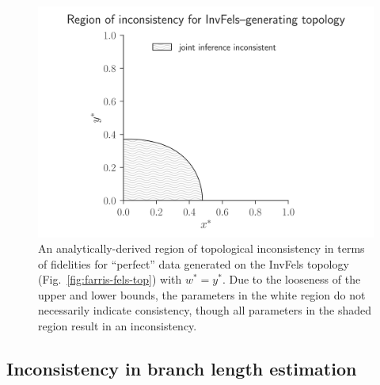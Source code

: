 \documentclass[11pt]{article}
\begin{document}
\begin{figure}
\centering
\includegraphics[width=\textwidth]{topology-inconsistency-inkscape}
\caption{
    An analytically-derived region of topological inconsistency in terms of fidelities for ``perfect'' data generated on the InvFels topology (Fig.~\ref{fig:farris-fels-top}) with $w^* = y^*$.
    Due to the looseness of the upper and lower bounds, the parameters in the white region do not necessarily indicate consistency, though all parameters in the shaded region result in an inconsistency.
}
\label{fig:inconsistency-farris}
\end{figure}

\subsection*{Inconsistency in branch length estimation}
\end{document}
